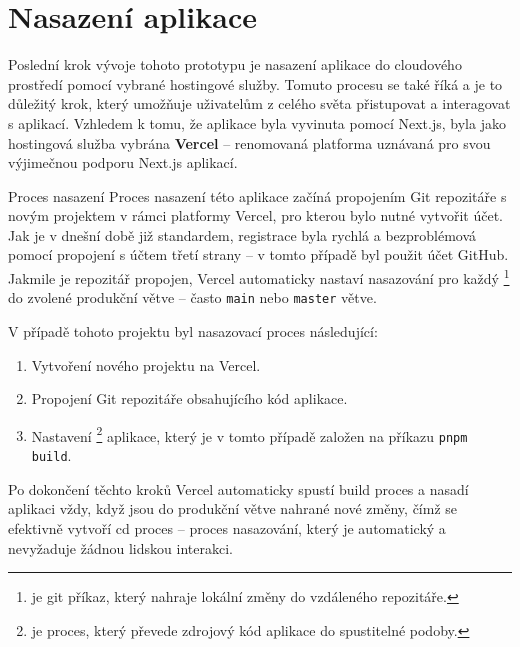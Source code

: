 \section{Nasazení aplikace}
\label{sec:implementace-deployment}
Poslední krok vývoje tohoto prototypu je nasazení aplikace do cloudového prostředí pomocí vybrané hostingové služby.
Tomuto procesu se také říká  a je to důležitý krok, který umožňuje uživatelům z celého světa přistupovat a interagovat s aplikací.
Vzhledem k tomu, že aplikace byla vyvinuta pomocí Next.js, byla jako hostingová služba vybrána \textbf{Vercel} – renomovaná platforma uznávaná pro svou výjimečnou podporu Next.js aplikací\cite{vd_vercel_com_docs}.

\begin{subsection}{Proces nasazení}
    \label{subsec:implementace-proces-nasazeni}
    Proces nasazení této aplikace začíná propojením Git repozitáře s novým projektem v rámci platformy Vercel, pro kterou bylo nutné vytvořit účet.
    Jak je v dnešní době již standardem, registrace byla rychlá a bezproblémová pomocí propojení s účtem třetí strany – v tomto případě byl použit účet GitHub.
    Jakmile je repozitář propojen, Vercel automaticky nastaví nasazování pro každý \footnote{ je git příkaz, který nahraje lokální změny do vzdáleného repozitáře\cite{g_docs_git_push}.} do zvolené produkční větve – často \texttt{main} nebo \texttt{master} větve.

    V případě tohoto projektu byl nasazovací proces následující:
    \begin{enumerate}
        \item Vytvoření nového projektu na Vercel.
        \item Propojení Git repozitáře obsahujícího kód aplikace.
        \item Nastavení \footnote{ je proces, který převede zdrojový kód aplikace do spustitelné podoby.} aplikace, který je v tomto případě založen na příkazu \texttt{pnpm build}.
    \end{enumerate}

    Po dokončení těchto kroků Vercel automaticky spustí build proces a nasadí aplikaci vždy, když jsou do produkční větve nahrané nové změny, čímž se efektivně vytvoří \ac{cd} proces – proces nasazování, který je automatický a nevyžaduje žádnou lidskou interakci.
\end{subsection}

